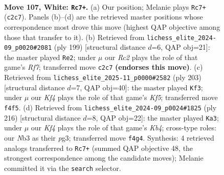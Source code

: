 \documentclass[11pt]{article}
\begin{document}
\clearpage

\begin{figure}[p]\centering
\begin{subfigure}{0.46\textwidth}\centering
\resizebox{\linewidth}{!}{%
\newchessgame
\chessboard[
  setfen={8/4k3/8/8/5K2/1N6/2R3Pr/8 w - - 78 107},
  showmover=false,
  pgfstyle=straightmove, color=movearrow, markmove={c2-c7}
]}
\caption{}
\end{subfigure}\hfill
\begin{subfigure}{0.46\textwidth}\centering
\resizebox{\linewidth}{!}{%
\newchessgame
\chessboard[
  setfen={8/1k6/8/8/8/R7/p4r2/2K5 b - - 27 100},
  showmover=false,
  pgfstyle=straightmove, color=movearrow, markmove={f2-e2}
]}
\caption{}
\end{subfigure}
\\[4pt]
\begin{subfigure}{0.46\textwidth}\centering
\resizebox{\linewidth}{!}{%
\newchessgame
\chessboard[
  setfen={8/8/3K4/8/5k1r/8/7p/7R b - - 1 102},
  showmover=false,
  pgfstyle=straightmove, color=movearrow, markmove={f4-f3}
]}
\caption{}
\end{subfigure}\hfill
\begin{subfigure}{0.46\textwidth}\centering
\resizebox{\linewidth}{!}{%
\newchessgame
\chessboard[
  setfen={8/8/5k2/7R/1K5P/6p1/7r/8 w - - 0 109},
  showmover=false,
  pgfstyle=straightmove, color=movearrow, markmove={b4-a3}
]}
\caption{}
\end{subfigure}
\caption{\textbf{Move 107, White: \texttt{Rc7+}.} (a) Our position; Melanie plays \texttt{Rc7+} (\texttt{c2c7}). Panels (b)--(d) are the retrieved master positions whose correspondence most drove this move (highest QAP objective among those that transfer to it). (b) Retrieved from \texttt{lichess\_elite\_2024-09\_p0020\#2081} (ply 199) [structural distance $d$=6, QAP obj=21]: the master played \texttt{Re2}; under $\mu$ our \emph{Rc2} plays the role of that game's \emph{Rf7}; transferred move \texttt{c2c7} \textbf{(endorses this move)}. (c) Retrieved from \texttt{lichess\_elite\_2025-11\_p0000\#2582} (ply 203) [structural distance $d$=7, QAP obj=40]: the master played \texttt{Kf3}; under $\mu$ our \emph{Kf4} plays the role of that game's \emph{Kf5}; transferred move \texttt{f4f5}. (d) Retrieved from \texttt{lichess\_elite\_2024-09\_p0024\#1825} (ply 216) [structural distance $d$=8, QAP obj=22]: the master played \texttt{Ka3}; under $\mu$ our \emph{Kf4} plays the role of that game's \emph{Kb4}; cross-type roles: our \emph{N}b3 as their \emph{p}g3; transferred move \texttt{f4g4}. Synthesis: 4 retrieved analogs transferred to \texttt{Rc7+} (summed QAP objective 48, the strongest correspondence among the candidate moves); Melanie committed it via the \texttt{search} selector.}
\label{fig:thought-m212}
\end{figure}
\end{document}
